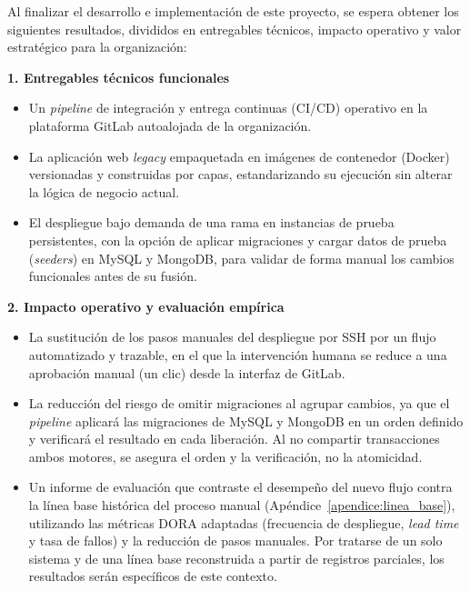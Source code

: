 Al finalizar el desarrollo e implementación de este proyecto, se espera obtener los siguientes resultados, divididos en entregables técnicos, impacto operativo y valor estratégico para la organización:

\textbf{1. Entregables técnicos funcionales}
\begin{itemize}
    \item Un \emph{pipeline} de integración y entrega continuas (CI/CD) operativo en la plataforma GitLab autoalojada de la organización.
    \item La aplicación web \emph{legacy} empaquetada en imágenes de contenedor (Docker) versionadas y construidas por capas, estandarizando su ejecución sin alterar la lógica de negocio actual.
    \item El despliegue bajo demanda de una rama en instancias de prueba persistentes, con la opción de aplicar migraciones y cargar datos de prueba (\emph{seeders}) en MySQL y MongoDB, para validar de forma manual los cambios funcionales antes de su fusión.
\end{itemize}

\textbf{2. Impacto operativo y evaluación empírica}
\begin{itemize}
    \item La sustitución de los pasos manuales del despliegue por SSH por un flujo automatizado y trazable, en el que la intervención humana se reduce a una aprobación manual (un clic) desde la interfaz de GitLab.
    \item La reducción del riesgo de omitir migraciones al agrupar cambios, ya que el \emph{pipeline} aplicará las migraciones de MySQL y MongoDB en un orden definido y verificará el resultado en cada liberación. Al no compartir transacciones ambos motores, se asegura el orden y la verificación, no la atomicidad.
    \item Un informe de evaluación que contraste el desempeño del nuevo flujo contra la línea base histórica del proceso manual (Apéndice~\ref{apendice:linea_base}), utilizando las métricas DORA adaptadas (frecuencia de despliegue, \emph{lead time} y tasa de fallos) y la reducción de pasos manuales. Por tratarse de un solo sistema y de una línea base reconstruida a partir de registros parciales, los resultados serán específicos de este contexto.
\end{itemize}

